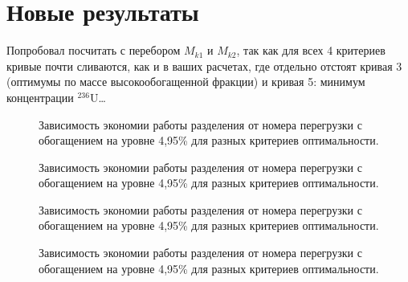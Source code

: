 \chapter{Новые результаты}


Попробовал посчитать с перебором $M_{k1}$ и $M_{k2}$, так как для  всех 4 критериев кривые почти сливаются, как и в ваших расчетах, где отдельно отстоят кривая 3 (оптимумы по массе высокообогащенной фракции) и кривая 5: минимум концентрации $^{236}$U\dots




\begin{figure}

\caption{{Зависимость экономии работы разделения от номера перегрузки с обогащением на уровне 4,95\% для разных критериев оптимальности.{\label{loop_sw}}}}
\end{figure}


\begin{figure}
    
    \caption{{Зависимость экономии работы разделения от номера перегрузки с обогащением на уровне 4,95\% для разных критериев оптимальности.{\label{loop_ex}}}}
    \end{figure}

\begin{figure}
    
    \caption{{Зависимость экономии работы разделения от номера перегрузки с обогащением на уровне 4,95\% для разных критериев оптимальности.{\label{loop_exR}}}}
    \end{figure}
    
    
    \begin{figure}
        
        \caption{{Зависимость экономии работы разделения от номера перегрузки с обогащением на уровне 4,95\% для разных критериев оптимальности.{\label{loop_pFo}}}}
        \end{figure}

\clearpage